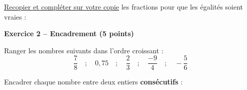 \documentclass[12pt,a4paper]{exam}
\begin{document}
\begin{questions}
    \question[3] \underline{Recopier et compléter sur votre copie} les fractions pour que 
    les égalités soient vraies :
    \vspace{5pt}
\end{questions}

\noindent\hrulefill
\vspace{0.5cm}


\textbf{Exercice 2 – Encadrement (5 points)}
\vspace{5pt}

\begin{questions}
    \question[2] Ranger les nombres suivants dans l’ordre croissant :
    \[
    \dfrac{7}{8} \quad ; \quad 0,75 \quad ; \quad \dfrac{2}{3} \quad ; \quad \dfrac{-9}{4} 
    \quad ; \quad -\dfrac{5}{6}
    \]

    \question[3] Encadrer chaque nombre entre deux entiers \textbf{consécutifs} :
\end{questions}
\end{document}
